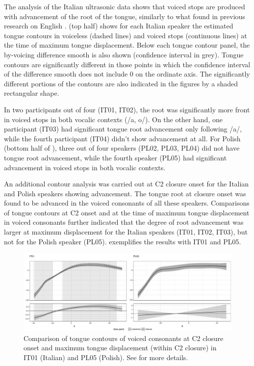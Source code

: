\documentclass[authoryear, twocolumn]{elsarticle}
\begin{document}
The analysis of the Italian ultrasonic data shows that voiced stops are
produced with advancement of the root of the tongue, similarly to what
found in previous research on English \citep{ahn2016}.  (top
half) shows for each Italian speaker the estimated tongue contours in
voiceless (dashed lines) and voiced stops (continuous lines) at the time
of maximum tongue displacement. Below each tongue contour panel, the
by-voicing difference smooth is also shown (confidence interval in
grey). Tongue contours are significantly different in those points in
which the confidence interval of the difference smooth does not include
0 on the ordinate axis. The significantly different portions of the
contours are also indicated in the figures by a shaded rectangular
shape.

In two participants out of four (IT01, IT02), the root was significantly
more front in voiced stops in both vocalic contexts (/a, o/). On the
other hand, one participant (IT03) had significant tongue root
advancement only following /a/, while the fourth participant (IT04)
didn't show advancement at all. For Polish (bottom half of
), three out of four speakers (PL02, PL03, PL04) did not
have tongue root advancement, while the fourth speaker (PL05) had
significant advancement in voiced stops in both vocalic contexts.

An additional contour analysis was carried out at C2 closure onset for
the Italian and Polish speakers showing advancement. The tongue root at
closure onset was found to be advanced in the voiced consonants of all
these speakers. Comparisons of tongue contours at C2 onset and at the
time of maximum tongue displacement in voiced consonants further
indicated that the degree of root advancement was larger at maximum
displacement for the Italian speakers (IT01, IT02, IT03), but not for
the Polish speaker (PL05).  exemplifies the results with
IT01 and PL05.

\begin{figure}
    \centering
    \includegraphics[width=.9\textwidth]{fig/voiced.pdf}
    \caption{Comparison of tongue contours of voiced consonants at C2 closure onset and maximum tongue displacement (within C2 closure) in IT01 (Italian) and PL05 (Polish). See  for more details.}
    \label{f:voiced}
\end{figure}
\end{document}
